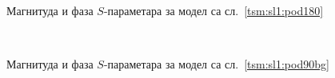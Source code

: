 \begin{figure}[!t]
\centering
{}\\
\caption{Магнитуда и фаза $S$-параметара за модел са сл.~\ref{tsm:sl1:pod180}}
\label{tsm:rez:pod180}
\end{figure}
\begin{figure}[!t]
\centering
{}\\
\caption{Магнитуда и фаза $S$-параметара за модел са сл.~\ref{tsm:sl1:pod90bg}}
\label{tsm:rez:pod90bg}
\end{figure}
